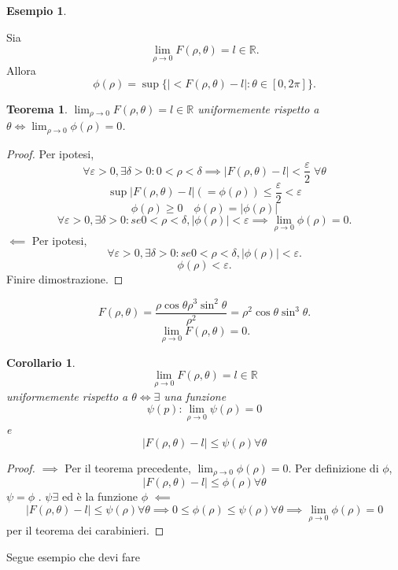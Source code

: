 \documentclass{article}
\theoremstyle{plain}
\newtheorem{thm}{Teorema}[section]
\newtheorem{cor}{Corollario}
\theoremstyle{definition}
\newtheorem{exmp}{Esempio}[section]
\theoremstyle{remark}
\begin{document}
\begin{exmp}
    
\end{exmp}

\vspace{10pt}

Sia \[\lim_{\rho\to0}F(\rho,\theta)=l\in\mathbb{R}.\] Allora \[\phi(\rho)=\sup\{|<F(\rho,\theta)-l|:\theta\in[0,2\pi]\}.\]

\begin{bxthm}
\begin{thm}
    $\lim_{\rho\to0}F(\rho,\theta)=l\in\mathbb{R}$ uniformemente rispetto a $\theta \iff \lim_{\rho\to0}\phi(\rho)=0$.
\end{thm}
\end{bxthm}
\begin{proof}
    Per ipotesi, \[\forall\varepsilon>0,\exists\delta>0:0<\rho<\delta\implies|F(\rho,\theta)-l|<\frac{\varepsilon}{2}\;\forall\theta\]
    \[\sup|F(\rho,\theta)-l| (=\phi(\rho))\leq\dfrac{\varepsilon}{2}<\varepsilon\]
    \[\phi(\rho)\geq0\quad \phi(\rho)=|\phi(\rho)|\]
    \[\forall\varepsilon>0,\exists\delta>0: se 0<\rho<\delta, |\phi(\rho)|<\varepsilon\implies \lim_{\rho\to0}\phi(\rho)=0.\]
    $\impliedby$
    Per ipotesi, \[\forall\varepsilon>0,\exists\delta>0: se 0<\rho<\delta, |\phi(\rho)|<\varepsilon.\]
    \[\phi(\rho)<\varepsilon.\]
    Finire dimostrazione.
\end{proof}
\[F(\rho,\theta)=\dfrac{\rho\cos\theta\rho^3\sin^2\theta}{\rho^2}=\rho^2\cos\theta\sin^3\theta. \]
\[\lim_{\rho\to0}F(\rho,\theta)=0.\]

\begin{bxthm}
\begin{cor}
    \[\lim_{\rho\to0}F(\rho,\theta)=l\in\mathbb{R}\] uniformemente rispetto a $\theta \iff \exists$ una funzione \[\psi(p):\lim_{\rho\to0}\psi(\rho)=0\] e \[|F(\rho,\theta)-l|\leq\psi(\rho)\forall\theta\]
\end{cor}
\end{bxthm}
\begin{proof}
    $\implies$ Per il teorema precedente, $\lim_{\rho\to0}\phi(\rho)=0$. Per definizione di $\phi$, \[|F(\rho,\theta)-l|\leq\phi(\rho)\forall\theta\]
    $\psi=\phi$ . $\psi \exists$ ed è la funzione $\phi$
    $\impliedby$ \[|F(\rho,\theta)-l|\leq\psi(\rho)\forall\theta\implies 0\leq\phi(\rho)\leq\psi(\rho)\forall\theta\implies\lim_{\rho\to0}\phi(\rho)=0\] per il teorema dei carabinieri.
\end{proof}

Segue esempio che devi fare
\end{document}

